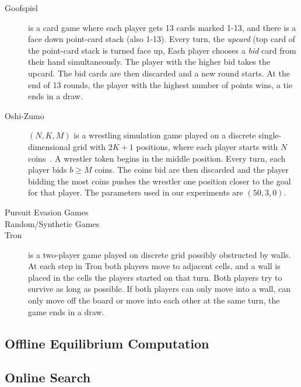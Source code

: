 \begin{description}
\item[Goofspiel] is a card game where each player gets 13 cards marked 1-13, and there is a face down
point-card stack (also 1-13). Every turn, the {\it upcard} (top card of the point-card stack is turned face up,
Each player chooses a {\it bid} card from their hand simultaneously.
The player with the higher bid takes the upcard. The bid cards are then discarded and a new round starts.
At the end of 13 rounds, the player with the highest number of points wins, a tie ends in a draw.

\item[Oshi-Zumo]$(N,K,M)$ is a wrestling simulation game played on a discrete single-dimensional grid with
$2K+1$ positions, where each player starts with $N$ coins~\cite{buro2003}. A wrestler token begins in the middle
position. Every turn,
each player bids $b \ge M$ coins. The coins bid are then discarded and the player bidding the most coins pushes the
wrestler one position closer to the goal for that player. The parameters used in our experiments are $(50,3,0)$.

\item[Pursuit Evasion Games]

\item[Random/Synthetic Games]

\item[Tron] is a two-player game played on discrete grid possibly obstructed by walls. At each
step in Tron both players move to adjacent cells, and a wall is placed in the cells the players started on that turn.
Both players try to survive as long as possible. If both players can only move into a wall, can only move off the board or move into each other at the same turn, the game ends  in a draw. 
\end{description}

\subsection{Offline Equilibrium Computation}

\subsection{Online Search}



